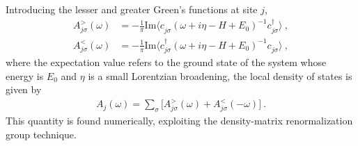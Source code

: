 \documentclass[aps,prl,showpacs,twocolumn,superscriptaddress]{revtex4-2}
\begin{document}
Introducing  the lesser and greater Green's functions at site $j$,
\begin{align}
A^{>}_{j\sigma}(\omega)&=-\frac{1}{\pi}\text{Im}\langle c^{}_{j\sigma}(\omega+i\eta-H+E^{}_{0})^{-1}c^{\dagger}_{j\sigma}\rangle\ ,\nonumber\\
A^{<}_{j\sigma}(\omega)&=-\frac{1}{\pi}\text{Im}\langle c_{j\sigma}^{\dagger}(\omega+i\eta-H+E^{}_{0})^{-1}c^{}_{j\sigma}\rangle\ ,\label{Aq}
\end{align}
where the expectation value refers to the ground state of the system whose energy is $E^{}_0$  and $\eta$ is a small Lorentzian  broadening, the local density of states is given by
\begin{align}
A^{}_{j}\left(\omega\right) = \sum_{\sigma} \big[ A^{>}_{j\sigma}\left(\omega\right) + A^{<}_{j\sigma}\left(-\omega\right)\big]\ .
\label{DOS}
\end{align}
This quantity is found numerically, exploiting the density-matrix renormalization group technique.
\end{document}

